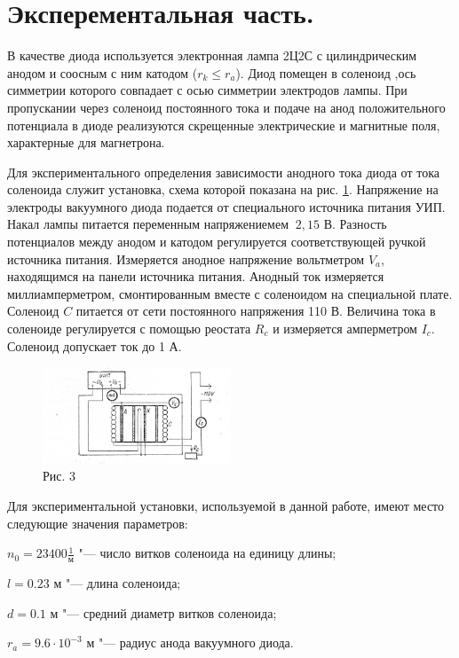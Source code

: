 \section{Эксперементальная часть.}

В качестве диода используется электронная лампа 2Ц2С с цилиндрическим анодом и соосным с ним катодом ($r_k \leq r_a$). Диод помещен в соленоид ,ось симметрии которого совпадает с осью симметрии электродов лампы. При пропускании через соленоид постоянного тока и подаче на анод положительного потенциала в диоде реализуются скрещенные электрические и магнитные поля, характерные для магнетрона. 

Для экспериментального определения зависимости анодного тока диода от тока соленоида служит установка, схема которой показана на рис. \ref{fig:image3}. Напряжение на электроды вакуумного диода подается от специального источника питания УИП. Накал лампы питается переменным напряжениемем $~ 2,15$ В. Разность потенциалов между анодом и катодом регулируется соответствующей ручкой источника питания. Измеряется анодное напряжение вольтметром $V_a$, находящимся на панели источника питания. Анодный ток измеряется миллиамперметром, смонтированным вместе с соленоидом на специальной плате. Соленоид $C$ питается от сети постоянного напряжения 110 В. Величина тока в соленоиде регулируется с помощью реостата $R_c$ и измеряется амперметром $I_c$. Соленоид допускает ток до 1 А.

\begin{figure}[!h]
    \centering
    \includegraphics[width = 0.5\textwidth]{image/image3.png}
    \caption{Рис. 3}
    \label{fig:image3}
\end{figure}

Для экспериментальной установки, используемой в данной работе, имеют место следующие значения параметров:

$n_0 = 23400 \frac{1}{\text{м}}$ "--- число витков соленоида на единицу длины;

$l = 0.23$ м "--- длина соленоида;

$d = 0.1$ м "--- средний диаметр витков соленоида;

$r_a = 9.6 \cdot 10^{-3}$ м "--- радиус анода вакуумного диода.

